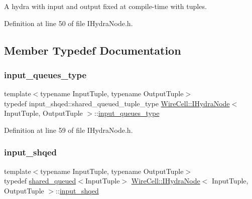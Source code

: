 A hydra with input and output fixed at compile-\/time with tuples. 

Definition at line 50 of file I\+Hydra\+Node.\+h.



\subsection{Member Typedef Documentation}
\mbox{\label{class_wire_cell_1_1_i_hydra_node_ada2ba4a3ba2716c9838ae039e475d683}} 
\subsubsection{\texorpdfstring{input\+\_\+queues\+\_\+type}{input\_queues\_type}}
{\footnotesize\ttfamily template$<$typename Input\+Tuple, typename Output\+Tuple$>$ \\
typedef input\+\_\+shqed\+::shared\+\_\+queued\+\_\+tuple\+\_\+type \hyperlink{class_wire_cell_1_1_i_hydra_node}{Wire\+Cell\+::\+I\+Hydra\+Node}$<$ Input\+Tuple, Output\+Tuple $>$\+::\hyperlink{class_wire_cell_1_1_i_hydra_node_ada2ba4a3ba2716c9838ae039e475d683}{input\+\_\+queues\+\_\+type}}



Definition at line 59 of file I\+Hydra\+Node.\+h.

\mbox{\label{class_wire_cell_1_1_i_hydra_node_a04628fe3ce00c28c1c9f27aca26e20c9}} 
\subsubsection{\texorpdfstring{input\+\_\+shqed}{input\_shqed}}
{\footnotesize\ttfamily template$<$typename Input\+Tuple, typename Output\+Tuple$>$ \\
typedef \hyperlink{struct_wire_cell_1_1shared__queued}{shared\+\_\+queued}$<$Input\+Tuple$>$ \hyperlink{class_wire_cell_1_1_i_hydra_node}{Wire\+Cell\+::\+I\+Hydra\+Node}$<$ Input\+Tuple, Output\+Tuple $>$\+::\hyperlink{class_wire_cell_1_1_i_hydra_node_a04628fe3ce00c28c1c9f27aca26e20c9}{input\+\_\+shqed}}



